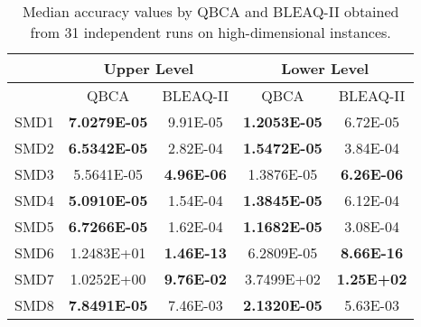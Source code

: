 \documentclass[conference]{IEEEtran}
\theoremstyle{definition}
\begin{document}
\begin{table}[t]
    \caption{Median accuracy values by QBCA and BLEAQ-II obtained from 31 independent
             runs on high-dimensional instances.}
    \label{tab:ll-comparative-vals}
    \centering
    \begin{tabular}{|c|c|c|c|c|}
\hline
& \multicolumn{2}{c|}{Upper Level} & \multicolumn{2}{c|}{Lower Level} \\ \hline
& QBCA & BLEAQ-II & QBCA & BLEAQ-II \\ \hline
SMD1 & \textbf{7.0279E-05}  &  9.91E-05 & \textbf{1.2053E-05} &          6.72E-05 \\ \hline
SMD2 & \textbf{6.5342E-05}  &  2.82E-04 & \textbf{1.5472E-05} &          3.84E-04 \\ \hline
SMD3 & 5.5641E-05    & \textbf{4.96E-06}&          1.3876E-05 & \textbf{6.26E-06} \\ \hline
SMD4 & \textbf{5.0910E-05}  &  1.54E-04 & \textbf{1.3845E-05} &          6.12E-04 \\ \hline
SMD5 & \textbf{6.7266E-05}  &  1.62E-04 & \textbf{1.1682E-05} &          3.08E-04 \\ \hline
SMD6 & 1.2483E+01  &  \textbf{1.46E-13} &          6.2809E-05 & \textbf{8.66E-16} \\ \hline
SMD7 & 1.0252E+00  &  \textbf{9.76E-02} &          3.7499E+02 & \textbf{1.25E+02} \\ \hline
SMD8 & \textbf{7.8491E-05}  &           7.46E-03 & \textbf{2.1320E-05} &          5.63E-03 \\ \hline

    \end{tabular}
\end{table}
\end{document}
